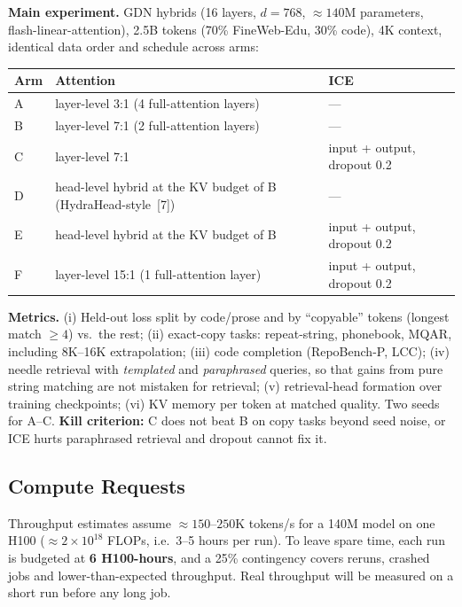 \documentclass[10pt]{article}
\begin{document}
\textbf{Main experiment.} GDN hybrids (16 layers, $d{=}768$, ${\approx}140$M parameters, flash-linear-attention), 2.5B tokens (70\% FineWeb-Edu, 30\% code), 4K context, identical data order and schedule across arms:

\begin{center}\small
\begin{tabular}{@{}lll@{}}
\toprule
Arm & Attention & ICE \\
\midrule
A & layer-level 3:1 (4 full-attention layers) & --- \\
B & layer-level 7:1 (2 full-attention layers) & --- \\
C & layer-level 7:1 & input + output, dropout 0.2 \\
D & head-level hybrid at the KV budget of B (HydraHead-style~[7]) & --- \\
E & head-level hybrid at the KV budget of B & input + output, dropout 0.2 \\
F & layer-level 15:1 (1 full-attention layer) & input + output, dropout 0.2 \\
\bottomrule
\end{tabular}
\end{center}

\textbf{Metrics.} (i) Held-out loss split by code/prose and by ``copyable'' tokens (longest match $\ge 4$) vs.\ the rest; (ii) exact-copy tasks: repeat-string, phonebook, MQAR, including 8K--16K extrapolation; (iii) code completion (RepoBench-P, LCC); (iv) needle retrieval with \emph{templated} and \emph{paraphrased} queries, so that gains from pure string matching are not mistaken for retrieval; (v) retrieval-head formation over training checkpoints; (vi) KV memory per token at matched quality. Two seeds for A--C. \textbf{Kill criterion:} C does not beat B on copy tasks beyond seed noise, or ICE hurts paraphrased retrieval and dropout cannot fix it.

\subsection{Compute Requests}

Throughput estimates assume ${\approx}150$--$250$K tokens/s for a 140M model on one H100 (${\approx}2\times10^{18}$ FLOPs, i.e.\ 3--5 hours per run). To leave spare time, each run is budgeted at \textbf{6 H100-hours}, and a 25\% contingency covers reruns, crashed jobs and lower-than-expected throughput. Real throughput will be measured on a short run before any long job.
\end{document}
